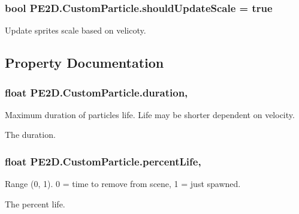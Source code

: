 \subsubsection[{should\+Update\+Scale}]{\setlength{\rightskip}{0pt plus 5cm}bool P\+E2\+D.\+Custom\+Particle.\+should\+Update\+Scale = true}\label{class_p_e2_d_1_1_custom_particle_a13a2f64584e65a38d7ec7b27f1d3fcd2}


Update sprites scale based on velicoty. 



\subsection{Property Documentation}
\hypertarget{class_p_e2_d_1_1_custom_particle_abb3aec5eef9b58cf98c6000da1ad732e}{}
\subsubsection[{duration}]{\setlength{\rightskip}{0pt plus 5cm}float P\+E2\+D.\+Custom\+Particle.\+duration\hspace{0.3cm}{\ttfamily [get]}, {\ttfamily [set]}}\label{class_p_e2_d_1_1_custom_particle_abb3aec5eef9b58cf98c6000da1ad732e}


Maximum duration of particles life. Life may be shorter dependent on velocity. 

The duration.\hypertarget{class_p_e2_d_1_1_custom_particle_ab8a4cc9c8de193c92fecb50634358823}{}
\subsubsection[{percent\+Life}]{\setlength{\rightskip}{0pt plus 5cm}float P\+E2\+D.\+Custom\+Particle.\+percent\+Life\hspace{0.3cm}{\ttfamily [get]}, {\ttfamily [set]}}\label{class_p_e2_d_1_1_custom_particle_ab8a4cc9c8de193c92fecb50634358823}


Range (0, 1). 0 = time to remove from scene, 1 = just spawned. 

The percent life.\hypertarget{class_p_e2_d_1_1_custom_particle_a6a116a174bdc1007d31528712f19aa7f}{}
